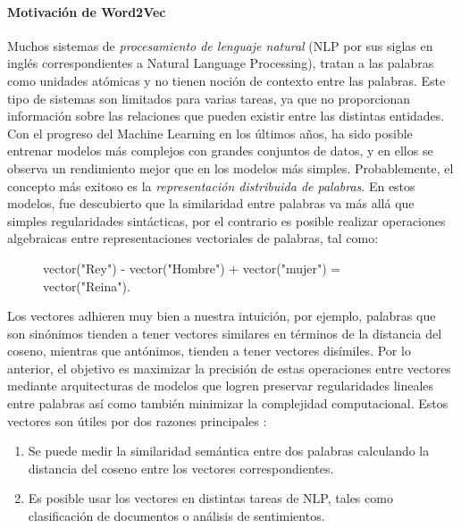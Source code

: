 \paragraph{Motivación de Word2Vec}
Muchos sistemas de \textit{procesamiento de lenguaje natural} (NLP por sus siglas en inglés correspondientes a Natural Language Processing), tratan a las palabras como unidades atómicas y no tienen noción de contexto entre las palabras. Este tipo de sistemas son limitados para varias tareas, ya que no proporcionan información sobre las relaciones que pueden existir entre las distintas entidades. Con el progreso del Machine Learning en los últimos años, ha sido posible entrenar modelos más complejos con grandes conjuntos de datos, y en ellos se observa un rendimiento mejor que en los modelos más simples. Probablemente, el concepto más exitoso es la \textit{representación distribuida de palabras}. En estos modelos, fue descubierto que la similaridad entre palabras va más allá que simples regularidades sintácticas, por el contrario es posible realizar operaciones algebraicas entre representaciones vectoriales de palabras, tal como:

\begin{figure}[!htbp]
	\begin{centerverbatim}
		vector("Rey") - vector("Hombre") + vector("mujer") = vector("Reina").
	\end{centerverbatim}
\end{figure}

Los vectores adhieren muy bien a nuestra intuición, por ejemplo, palabras que son sinónimos tienden a tener vectores similares en términos de la distancia del coseno, mientras que antónimos, tienden a tener vectores disímiles. Por lo anterior, el objetivo es maximizar la precisión de estas operaciones entre vectores mediante arquitecturas de modelos que logren preservar regularidades lineales entre palabras así como también minimizar la complejidad computacional. Estos vectores son útiles por dos razones principales \citep{mccormick2016word2vec}:

\begin{enumerate}
	\item Se puede medir la similaridad semántica entre dos palabras calculando la distancia del coseno entre los vectores correspondientes.
	\item Es posible usar los vectores en distintas tareas de NLP, tales como clasificación de documentos o análisis de sentimientos.
\end{enumerate}

